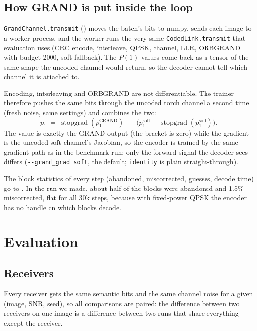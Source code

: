 \documentclass{article}
\begin{document}
\subsection{How GRAND is put inside the loop}

\texttt{GrandChannel.transmit} () moves the batch's bits to numpy,
sends each image to a worker process, and the worker runs the very same \texttt{CodedLink.transmit}
that evaluation uses (CRC encode, interleave, QPSK, channel, LLR, ORBGRAND with budget 2000, soft
fallback). The $P(1)$ values come back as a tensor of the same shape the uncoded channel would return,
so the decoder cannot tell which channel it is attached to.

\begin{conceptbox}[title=Why the gradient needs a trick]
Encoding, interleaving and ORBGRAND are not differentiable. The trainer therefore pushes the same bits
through the uncoded torch channel a second time (fresh noise, same settings) and combines the two:
\[
p_1 \;=\; \operatorname{stopgrad}(p_1^{\text{GRAND}}) \;+\; \bigl(p_1^{\text{soft}} - \operatorname{stopgrad}(p_1^{\text{soft}})\bigr).
\]
The value is exactly the GRAND output (the bracket is zero) while the gradient is the uncoded soft
channel's Jacobian, so the encoder is trained by the same gradient path as in the benchmark run; only
the forward signal the decoder sees differs (\texttt{-{}-grand\_grad soft}, the default;
\texttt{identity} is plain straight-through).
\end{conceptbox}

The block statistics of every step (abandoned, miscorrected, guesses, decode time) go to
. In the run we made, about half of the blocks were abandoned and 1.5\% miscorrected, flat
for all 30k steps, because with fixed-power QPSK the encoder has no handle on which blocks decode.

\section{Evaluation}

\subsection{Receivers}
\label{sec:receivers}

Every receiver gets the same semantic bits and the same channel noise for a given (image, SNR, seed),
so all comparisons are paired: the difference between two receivers on one image is a difference
between two runs that share everything except the receiver.
\end{document}
